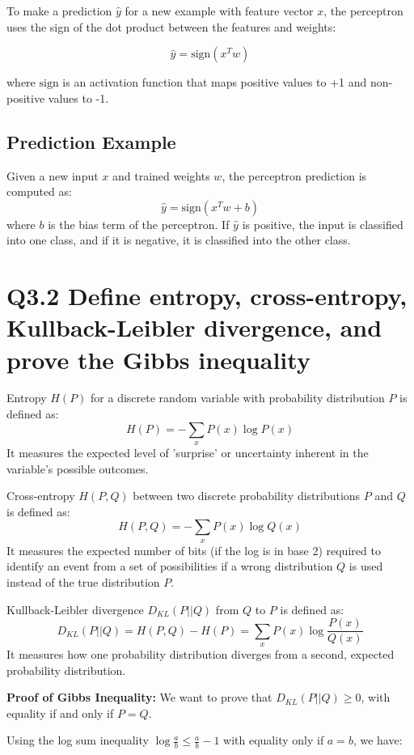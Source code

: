 \documentclass[11pt]{article}
\begin{document}
To make a prediction \( \hat{y} \) for a new example with feature vector \( x \), the perceptron uses the sign of the dot product between the features and weights:

\[
\hat{y} = \text{sign}(x^T w)
\]

where \( \text{sign} \) is an activation function that maps positive values to +1 and non-positive values to -1.

\subsection*{Prediction Example}
Given a new input \( x \) and trained weights \( w \), the perceptron prediction is computed as:
\[
\hat{y} = \text{sign}(x^T w + b)
\]
where \( b \) is the bias term of the perceptron. If \( \hat{y} \) is positive, the input is classified into one class, and if it is negative, it is classified into the other class.


\section{Q3.2 Define entropy, cross-entropy, Kullback-Leibler divergence, and prove the Gibbs inequality}

Entropy \( H(P) \) for a discrete random variable with probability distribution \( P \) is defined as:
\[
H(P) = - \sum_x P(x) \log P(x)
\]
It measures the expected level of 'surprise' or uncertainty inherent in the variable's possible outcomes.

Cross-entropy \( H(P, Q) \) between two discrete probability distributions \( P \) and \( Q \) is defined as:
\[
H(P, Q) = - \sum_x P(x) \log Q(x)
\]
It measures the expected number of bits (if the log is in base 2) required to identify an event from a set of possibilities if a wrong distribution \( Q \) is used instead of the true distribution \( P \).

Kullback-Leibler divergence \( D_{KL}(P||Q) \) from \( Q \) to \( P \) is defined as:
\[
D_{KL}(P||Q) = H(P, Q) - H(P) = \sum_x P(x) \log \frac{P(x)}{Q(x)}
\]
It measures how one probability distribution diverges from a second, expected probability distribution.

\textbf{Proof of Gibbs Inequality:}
We want to prove that \( D_{KL}(P||Q) \geq 0 \), with equality if and only if \( P = Q \).

Using the log sum inequality \( \log \frac{a}{b} \leq \frac{a}{b} - 1 \) with equality only if \( a = b \), we have:
\end{document}
